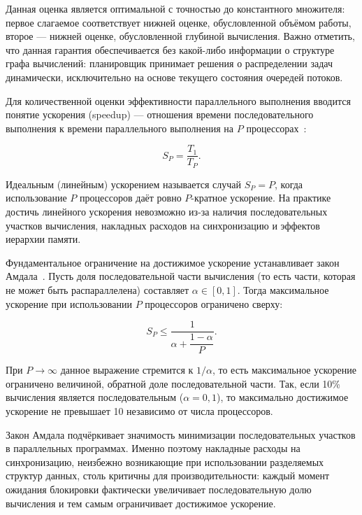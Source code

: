 Данная оценка является оптимальной с точностью до константного
множителя: первое слагаемое соответствует нижней оценке,
обусловленной объёмом работы, второе --- нижней оценке,
обусловленной глубиной вычисления. Важно отметить, что данная
гарантия обеспечивается без какой-либо информации о структуре
графа вычислений: планировщик принимает решения о распределении
задач динамически, исключительно на основе текущего состояния
очередей потоков.

Для количественной оценки эффективности параллельного выполнения
вводится понятие ускорения (speedup) --- отношения времени
последовательного выполнения к времени параллельного выполнения
на $P$ процессорах~\cite{Herlihy2020}:

\begin{equation}
    S_P = \frac{T_1}{T_P}.
    \label{eq:speedup}
\end{equation}

Идеальным (линейным) ускорением называется случай $S_P = P$,
когда использование $P$ процессоров даёт ровно $P$-кратное
ускорение. На практике достичь линейного ускорения невозможно
из-за наличия последовательных участков вычисления, накладных
расходов на синхронизацию и эффектов иерархии памяти.

Фундаментальное ограничение на достижимое ускорение устанавливает
закон Амдала~\cite{Amdahl1967}. Пусть доля последовательной части
вычисления (то есть части, которая не может быть распараллелена)
составляет $\alpha \in [0, 1]$. Тогда максимальное ускорение
при использовании $P$ процессоров ограничено сверху:

\begin{equation}
    S_P \leq \frac{1}{\alpha + \dfrac{1 - \alpha}{P}}.
    \label{eq:amdahl}
\end{equation}

При $P \to \infty$ данное выражение стремится к $1 / \alpha$,
то есть максимальное ускорение ограничено величиной, обратной
доле последовательной части. Так, если 10\% вычисления является
последовательным ($\alpha = 0{,}1$), то максимально достижимое
ускорение не превышает 10 независимо от числа процессоров.

Закон Амдала подчёркивает значимость минимизации последовательных
участков в параллельных программах. Именно поэтому накладные
расходы на синхронизацию, неизбежно возникающие при использовании
разделяемых структур данных, столь критичны для производительности:
каждый момент ожидания блокировки фактически увеличивает
последовательную долю вычисления и тем самым ограничивает
достижимое ускорение.

